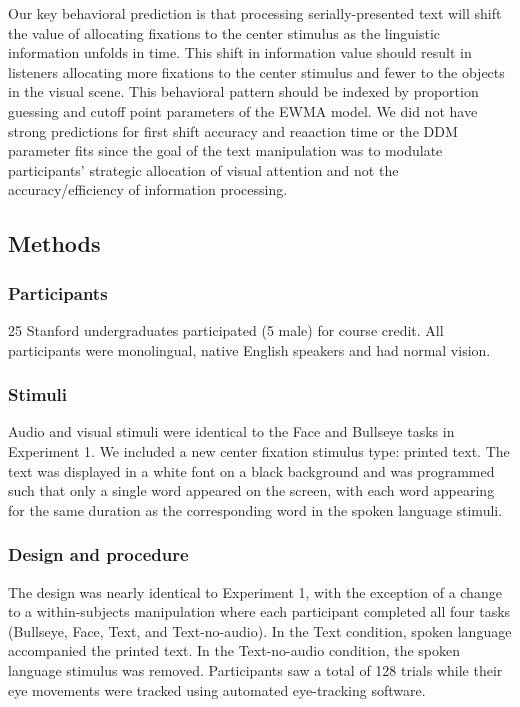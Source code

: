 \documentclass[english,floatsintext,man]{apa6}
\begin{document}
Our key behavioral prediction is that processing serially-presented text
will shift the value of allocating fixations to the center stimulus as
the linguistic information unfolds in time. This shift in information
value should result in listeners allocating more fixations to the center
stimulus and fewer to the objects in the visual scene. This behavioral
pattern should be indexed by proportion guessing and cutoff point
parameters of the EWMA model. We did not have strong predictions for
first shift accuracy and reaaction time or the DDM parameter fits since
the goal of the text manipulation was to modulate participants'
strategic allocation of visual attention and not the accuracy/efficiency
of information processing.

\hypertarget{methods-1}{%
\subsection{Methods}\label{methods-1}}

\hypertarget{participants-1}{%
\subsubsection{Participants}\label{participants-1}}

25 Stanford undergraduates participated (5 male) for course credit. All
participants were monolingual, native English speakers and had normal
vision.

\hypertarget{stimuli-1}{%
\subsubsection{Stimuli}\label{stimuli-1}}

Audio and visual stimuli were identical to the Face and Bullseye tasks
in Experiment 1. We included a new center fixation stimulus type:
printed text. The text was displayed in a white font on a black
background and was programmed such that only a single word appeared on
the screen, with each word appearing for the same duration as the
corresponding word in the spoken language stimuli.

\hypertarget{design-and-procedure-1}{%
\subsubsection{Design and procedure}\label{design-and-procedure-1}}

The design was nearly identical to Experiment 1, with the exception of a
change to a within-subjects manipulation where each participant
completed all four tasks (Bullseye, Face, Text, and Text-no-audio). In
the Text condition, spoken language accompanied the printed text. In the
Text-no-audio condition, the spoken language stimulus was removed.
Participants saw a total of 128 trials while their eye movements were
tracked using automated eye-tracking software.
\end{document}

